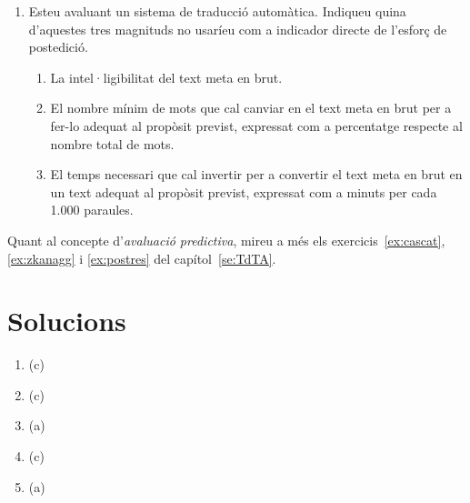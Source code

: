 \begin{enumerate}
\item Esteu avaluant un sistema de traducció automàtica. Indiqueu
  quina d'aquestes tres magnituds no usaríeu com a indicador directe
  de l'esforç de postedició.
  \begin{enumerate}
  \item La intel·ligibilitat del text meta en brut.
  \item El nombre mínim de mots que cal canviar en el text meta en
    brut per a fer-lo adequat al propòsit previst, expressat com a
    percentatge respecte al nombre total de mots.
  \item El temps necessari que cal invertir per a convertir el text
    meta en brut en un text adequat al propòsit previst, expressat com
    a minuts per cada 1.000 paraules.
  \end{enumerate}

\end{enumerate}

Quant al concepte d'\emph{avaluació predictiva}, mireu a més els
exercicis~\ref{ex:cascat}, \ref{ex:zkanagg} i \ref{ex:postres} del
capítol~\ref{se:TdTA}.


\section{Solucions}

\begin{enumerate}
\item (c)
\item (c)
\item (a)
\item (c)
\item (a)
\end{enumerate}


